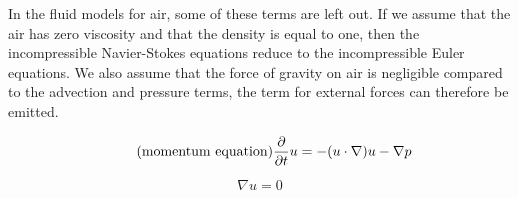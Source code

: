 In the fluid models for air, some of these terms are left out. If we assume that 
the air has zero viscosity and that the density is equal to one, then the 
incompressible Navier-Stokes equations reduce to the incompressible Euler 
equations. We also assume that the force of gravity on air is negligible compared 
to the advection and pressure terms, the term for external forces can therefore be 
emitted. 

\begin{equation} 
	\tag{momentum equation}
	\frac{\partial}{\partial t}u  = -(u \cdot \nabla)u - \nabla p
\end{equation}

\begin{equation}
	\tag{continuity equation}
	\nabla u = 0
\end{equation}
